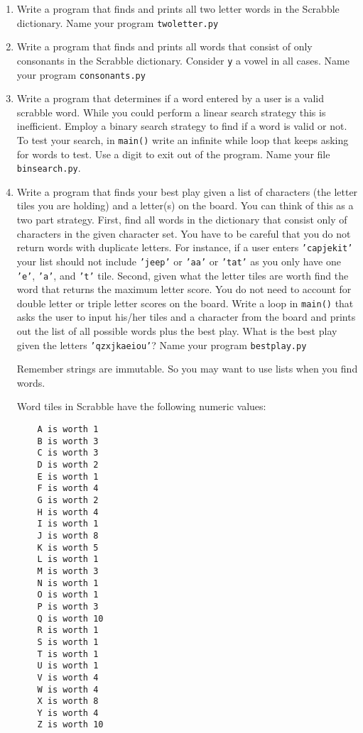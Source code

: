 \documentclass[12pt]{article}
\begin{document}
\begin{enumerate}
\item Write a program that finds and prints all two letter words in the Scrabble dictionary. Name your program \texttt{twoletter.py}

\item Write a program that finds and prints all words that consist of only consonants in the Scrabble dictionary. Consider \texttt{y} a vowel in all cases. Name your program \texttt{consonants.py}

\item Write a program that determines if a word entered by a user is a valid scrabble word. While you could perform a linear search strategy this is inefficient. Employ a binary search strategy to find if a word is valid or not. To test your search, in \texttt{main()} write an infinite while loop that keeps asking for words to test. Use a digit to exit out of the program. Name your file \texttt{binsearch.py}.

\item Write a program that finds your best play given a list of characters (the letter tiles you are holding) and a letter(s) on the board. You can think of this as a two part strategy. First, find all words in the dictionary that consist only of characters in the given character set.  You have to be careful that you do not return words with duplicate letters. For instance, if a user enters \texttt{'capjekit'} your list should not include \texttt{'jeep'} or \texttt{'aa'} or \texttt{'tat'} as you only have one \texttt{'e'}, \texttt{'a'}, and \texttt{'t'} tile. Second, given what the letter tiles are worth find the word that returns the maximum letter score. You do not need to account for double letter or triple letter scores on the board. Write a loop in \texttt{main()} that asks the user to input his/her tiles and a character from the board and prints out the list of all possible words plus the best play. What is the best play given the letters \texttt{'qzxjkaeiou'}? Name your program \texttt{bestplay.py}

Remember strings are immutable. So you may want to use lists when you find words. 

Word tiles in Scrabble have the following numeric values:

\begin{verbatim}
    A is worth 1
    B is worth 3
    C is worth 3
    D is worth 2
    E is worth 1
    F is worth 4
    G is worth 2
    H is worth 4
    I is worth 1
    J is worth 8
    K is worth 5
    L is worth 1
    M is worth 3
    N is worth 1
    O is worth 1
    P is worth 3
    Q is worth 10
    R is worth 1
    S is worth 1
    T is worth 1
    U is worth 1
    V is worth 4
    W is worth 4
    X is worth 8
    Y is worth 4
    Z is worth 10
\end{verbatim}
   




\end{enumerate}
\end{document}
